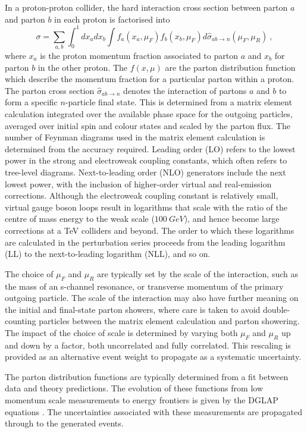 In a proton-proton collider, the hard interaction cross section between parton
$a$ and parton $b$ in each proton is factorised into \cite{Ellis:1991qj}
%
\begin{equation}
    \sigma = \sum_{a,b} \int_0^1 dx_a dx_b \int f_a(x_a,\mu_F)f_b(x_b,\mu_F) d\hat{\sigma}_{ab\rightarrow n}(\mu_F,\mu_R)\ ,
\end{equation}
%
where $x_a$ is the proton momentum fraction associated to parton $a$ and $x_b$ for parton $b$ in the other proton. The $f(x,\mu)$ are the parton distribution function which describe the momentum fraction for a particular parton within a proton. The parton cross section $\hat{\sigma}_{ab\rightarrow n}$ denotes the interaction of partons $a$ and $b$ to form a specific $n$-particle final state. This is determined from a matrix element calculation integrated over the available phase space for the outgoing particles, averaged over initial spin and colour states and scaled by the parton flux. The number of Feynman diagrams used in the matrix element calculation is determined from the accuracy required. Leading order (LO) refers to the lowest power in the strong and electroweak coupling constants, which often refers to tree-level diagrams. Next-to-leading order (NLO) generators include the next lowest power, with the inclusion of higher-order virtual and real-emission corrections. Although the electroweak coupling constant is relatively small, virtual gauge boson loops result in logarithms \cite{Sudakov:1954sw} that scale with the ratio of the centre of mass energy to the weak scale ($\SI{100}{GeV}$), and hence become large corrections at a TeV colliders and beyond. The order to which these logarithms are calculated in the perturbation series proceeds from the leading logarithm (LL) to the next-to-leading logarithm (NLL), and so on.

The choice of $\mu_F$ and $\mu_R$ are typically set by the scale of the interaction, such as the mass of an s-channel resonance, or transverse momentum of the primary outgoing particle. The scale of the interaction may also have further meaning on the initial and final-state parton showers, where care is taken to avoid double-counting particles between the matrix element calculation and parton showering. The impact of the choice of scale is determined by varying both $\mu_F$ and $\mu_R$ up and down by a factor, both uncorrelated and fully correlated. This rescaling is provided as an alternative event weight to propagate as a systematic uncertainty.

The parton distribution functions are typically determined from a fit between data and theory predictions. The evolution of these functions from low momentum scale measurements to energy frontiers is given by the DGLAP equations \cite{Altarelli:1977zs,Dokshitzer:1977sg,Gribov:1972ri}. The uncertainties associated with these measurements are propagated through to the generated events.


